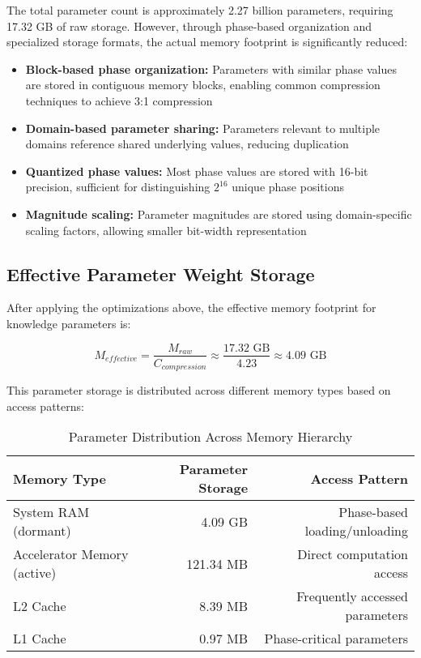 The total parameter count is approximately 2.27 billion parameters, requiring 17.32 GB of raw storage. However, through phase-based organization and specialized storage formats, the actual memory footprint is significantly reduced:

\begin{tcolorbox}[colback=LightGray, colframe=DarkGray, title=Parameter Compression \& Storage Optimization, fonttitle=\bfseries]
\begin{itemize}
    \item \textbf{Block-based phase organization:} Parameters with similar phase values are stored in contiguous memory blocks, enabling common compression techniques to achieve 3:1 compression
    \item \textbf{Domain-based parameter sharing:} Parameters relevant to multiple domains reference shared underlying values, reducing duplication
    \item \textbf{Quantized phase values:} Most phase values are stored with 16-bit precision, sufficient for distinguishing $2^{16}$ unique phase positions
    \item \textbf{Magnitude scaling:} Parameter magnitudes are stored using domain-specific scaling factors, allowing smaller bit-width representation
\end{itemize}
\end{tcolorbox}

\subsection{Effective Parameter Weight Storage}

After applying the optimizations above, the effective memory footprint for knowledge parameters is:

\begin{equation}
M_{effective} = \frac{M_{raw}}{C_{compression}} \approx \frac{17.32 \text{ GB}}{4.23} \approx 4.09 \text{ GB}
\end{equation}

This parameter storage is distributed across different memory types based on access patterns:

\begin{table}[h]
\centering
\begin{tabular}{|l|r|r|}
\hline
\textbf{Memory Type} & \textbf{Parameter Storage} & \textbf{Access Pattern} \\
\hline
System RAM (dormant) & 4.09 GB & Phase-based loading/unloading \\
\hline
Accelerator Memory (active) & 121.34 MB & Direct computation access \\
\hline
L2 Cache & 8.39 MB & Frequently accessed parameters \\
\hline
L1 Cache & 0.97 MB & Phase-critical parameters \\
\hline
\end{tabular}
\caption{Parameter Distribution Across Memory Hierarchy}
\end{table}

